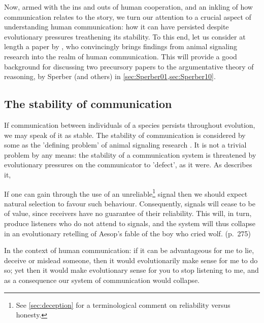 Now, armed with the ins and outs of human cooperation, and an inkling of how communication relates to the story, we turn our attention to a crucial aspect of understanding human communication: how it can have persisted despite evolutionary pressures treathening its stability. To this end, let us consider at length a paper by \citet{Scott-Phillips08}, who convincingly brings findings from animal signaling research into the realm of human communication. This will provide a good background for discussing two precursory papers to the argumentative theory of reasoning, by Sperber (and others) in \cref{sec:Sperber01,sec:Sperber10}.

\subsection{The stability of communication}
\label{sec:S-P08}


If communication between individuals of a species persists throughout evolution, we may speak of it as stable. The stability of communication is considered by some as the 'defining problem' of animal signaling research \citep{Scott-Phillips08}. It is not a trivial problem by any means: the stability of a communication system is threatened by evolutionary pressures on the communicator to 'defect', as it were. As \citet{Scott-Phillips08} describes it,
\begin{quoting}
    If one can gain through the use of an unreliable\footnote{See \cref{sec:deception} for a terminological comment on reliability versus honesty.} signal then we should expect natural selection to favour such behaviour. Consequently, signals will cease to be of value, since receivers have no guarantee of their reliability. This will, in turn, produce listeners who do not attend to signals, and the system will thus collapse in an evolutionary retelling of Aesop’s fable of the boy who cried wolf.
    \hfill (p.~275)
\end{quoting}
In the context of human communication: if it can be advantageous for me to lie, deceive or mislead someone, then it would evolutionarily make sense for me to do so; yet then it would make evolutionary sense for you to stop listening to me, and as a consequence our system of communication would collapse.

